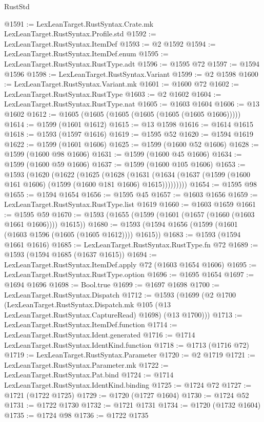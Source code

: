 \begin{lexlean}{RustStd}
\begin{coremodule}
{\begin{coremodule}
{{{{{{{{{{{{{{{{{{{{{{{{{{{{{{{{{{{{{{{{{{{{{{{@1591 := LexLeanTarget.RustSyntax.Crate.mk LexLeanTarget.RustSyntax.Profile.std
@1592 := LexLeanTarget.RustSyntax.ItemDef
@1593 := @2 @1592
@1594 := LexLeanTarget.RustSyntax.ItemDef.enum
@1595 := LexLeanTarget.RustSyntax.RustType.adt
@1596 := @1595 @72
@1597 := @1594 @1596
@1598 := LexLeanTarget.RustSyntax.Variant
@1599 := @2 @1598
@1600 := LexLeanTarget.RustSyntax.Variant.mk
@1601 := @1600 @72
@1602 := LexLeanTarget.RustSyntax.RustType
@1603 := @2 @1602
@1604 := LexLeanTarget.RustSyntax.RustType.nat
@1605 := @1603 @1604
@1606 := @13 @1602
@1612 := @1605 (@1605 (@1605 (@1605 (@1605 (@1605 @1606)))))
@1614 := @1599 (@1601 @1612)
@1615 := @13 @1598
@1616 := @1614 @1615
@1618 := @1593 (@1597 @1616)
@1619 := @1595 @52
@1620 := @1594 @1619
@1622 := @1599 (@1601 @1606)
@1625 := @1599 (@1600 @52 @1606)
@1628 := @1599 (@1600 @98 @1606)
@1631 := @1599 (@1600 @45 @1606)
@1634 := @1599 (@1600 @59 @1606)
@1637 := @1599 (@1600 @105 @1606)
@1653 := @1593
    (@1620
      (@1622
        (@1625
          (@1628
            (@1631 (@1634 (@1637 (@1599 (@1600 @161 @1606) (@1599 (@1600 @181 @1606) @1615)))))))))
@1654 := @1595 @98
@1655 := @1594 @1654
@1656 := @1595 @45
@1657 := @1603 @1656
@1659 := LexLeanTarget.RustSyntax.RustType.list @1619
@1660 := @1603 @1659
@1661 := @1595 @59
@1670 := @1593 (@1655 (@1599 (@1601 (@1657 (@1660 (@1603 @1661 @1606)))) @1615))
@1680 := @1593 (@1594 @1656 (@1599 (@1601 (@1603 @1596 (@1605 (@1605 @1612)))) @1615))
@1683 := @1593 (@1594 @1661 @1616)
@1685 := LexLeanTarget.RustSyntax.RustType.fn @72
@1689 := @1593 (@1594 @1685 (@1637 @1615))
@1694 := LexLeanTarget.RustSyntax.ItemDef.apply @72 (@1603 @1654 @1606)
@1695 := LexLeanTarget.RustSyntax.RustType.option
@1696 := @1695 @1654
@1697 := @1694 @1696
@1698 := Bool.true
@1699 := @1697 @1698
@1700 := LexLeanTarget.RustSyntax.Dispatch
@1712 := @1593
    (@1699
      (@2
        @1700
        (LexLeanTarget.RustSyntax.Dispatch.mk @105 (@13 LexLeanTarget.RustSyntax.CaptureRead) @1698)
        (@13 @1700)))
@1713 := LexLeanTarget.RustSyntax.ItemDef.function
@1714 := LexLeanTarget.RustSyntax.Ident.generated
@1716 := @1714 LexLeanTarget.RustSyntax.IdentKind.function
@1718 := @1713 (@1716 @72)
@1719 := LexLeanTarget.RustSyntax.Parameter
@1720 := @2 @1719
@1721 := LexLeanTarget.RustSyntax.Parameter.mk
@1722 := LexLeanTarget.RustSyntax.Pat.bind
@1724 := @1714 LexLeanTarget.RustSyntax.IdentKind.binding
@1725 := @1724 @72
@1727 := @1721 (@1722 @1725)
@1729 := @1720 (@1727 @1604)
@1730 := @1724 @52
@1731 := @1722 @1730
@1732 := @1721 @1731
@1734 := @1720 (@1732 @1604)
@1735 := @1724 @98
@1736 := @1722 @1735
}}}}}}}}}}}}}}}}}}}}}}}}}}}}}}}}}}}}}}}}}}}}}}}
\end{coremodule}}
\end{coremodule}
\end{lexlean}
